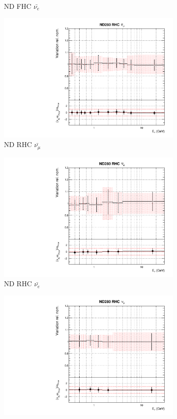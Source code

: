 \begin{figure}
\begin{subfigure}{0.24\textwidth}
  \caption{ND FHC $\bar{\nu_{e}}$}
  \label{fig:}
\end{subfigure}
\begin{subfigure}{0.24\textwidth}
  \centering
  \includegraphics[width=0.95\linewidth]{figs/asmvflux4}
  \caption{ND RHC $\bar{\nu_{\mu}}$}
  \label{fig:}
\end{subfigure}
\begin{subfigure}{0.24\textwidth}
  \centering
  \includegraphics[width=0.95\linewidth]{figs/asmvflux5}
  \caption{ND RHC $\bar{\nu_{e}}$}
  \label{fig:}
\end{subfigure}
\begin{subfigure}{0.24\textwidth}
  \centering
  \includegraphics[width=0.95\linewidth]{figs/asmvflux6}

\end{subfigure}
\end{figure}
